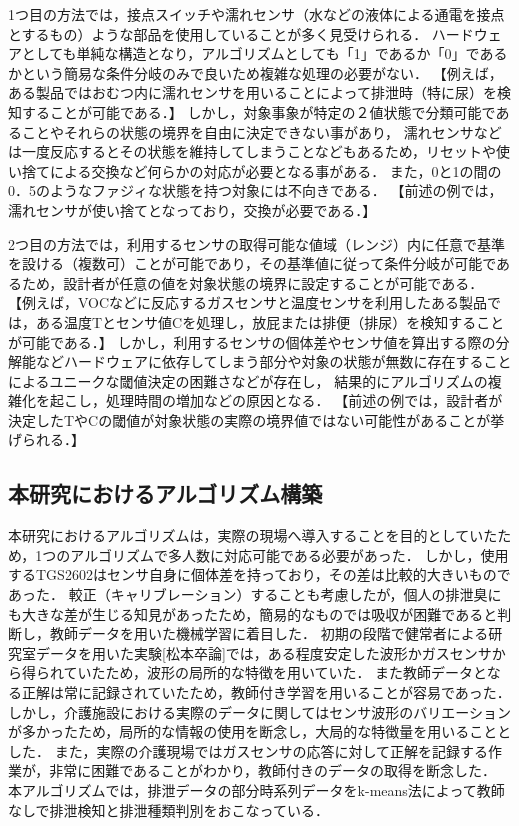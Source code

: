 1つ目の方法では，接点スイッチや濡れセンサ（水などの液体による通電を接点とするもの）ような部品を使用していることが多く見受けられる．
ハードウェアとしても単純な構造となり，アルゴリズムとしても「1」であるか「0」であるかという簡易な条件分岐のみで良いため複雑な処理の必要がない．
{\color{red}【例えば，ある製品ではおむつ内に濡れセンサを用いることによって排泄時（特に尿）を検知することが可能である．】}
しかし，対象事象が特定の２値状態で分類可能であることやそれらの状態の境界を自由に決定できない事があり，
濡れセンサなどは一度反応するとその状態を維持してしまうことなどもあるため，リセットや使い捨てによる交換など何らかの対応が必要となる事がある．
また，0と1の間の0．5のようなファジィな状態を持つ対象には不向きである．
{\color{red}【前述の例では，濡れセンサが使い捨てとなっており，交換が必要である．】}\par
2つ目の方法では，利用するセンサの取得可能な値域（レンジ）内に任意で基準を設ける（複数可）ことが可能であり，その基準値に従って条件分岐が可能であるため，設計者が任意の値を対象状態の境界に設定することが可能である．
{\color{red}【例えば，VOCなどに反応するガスセンサと温度センサを利用したある製品では，ある温度Tとセンサ値Cを処理し，放屁または排便（排尿）を検知することが可能である．】}
しかし，利用するセンサの個体差やセンサ値を算出する際の分解能などハードウェアに依存してしまう部分や対象の状態が無数に存在することによるユニークな閾値決定の困難さなどが存在し，
結果的にアルゴリズムの複雑化を起こし，処理時間の増加などの原因となる．
{\color{red}【前述の例では，設計者が決定したTやCの閾値が対象状態の実際の境界値ではない可能性があることが挙げられる．】}


\subsection{本研究におけるアルゴリズム構築}\label{chap:3.3.2}
本研究におけるアルゴリズムは，実際の現場へ導入することを目的としていたため，1つのアルゴリズムで多人数に対応可能である必要があった．
しかし，使用するTGS2602\footnotemark[1]はセンサ自身に個体差を持っており，その差は比較的大きいものであった．
較正（キャリブレーション）することも考慮したが，個人の排泄臭にも大きな差が生じる知見があったため，簡易的なものでは吸収が困難であると判断し，教師データを用いた機械学習に着目した．
初期の段階で健常者による研究室データを用いた実験[松本卒論]では，ある程度安定した波形かガスセンサから得られていたため，波形の局所的な特徴を用いていた．
また教師データとなる正解は常に記録されていたため，教師付き学習を用いることが容易であった．
しかし，介護施設における実際のデータに関してはセンサ波形のバリエーションが多かったため，局所的な情報の使用を断念し，大局的な特徴量を用いることとした．
また，実際の介護現場ではガスセンサの応答に対して正解を記録する作業が，非常に困難であることがわかり，教師付きのデータの取得を断念した．
本アルゴリズムでは，排泄データの部分時系列データをk-means法によって教師なしで排泄検知と排泄種類判別をおこなっている．

